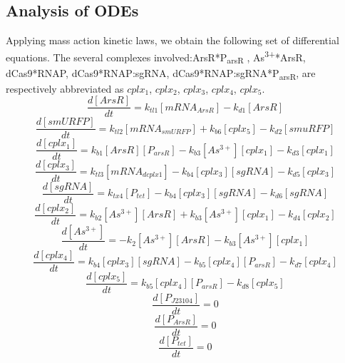 \subsection{Analysis of ODEs}
Applying mass action kinetic laws, we obtain the following set of differential equations. The several complexes involved:ArsR*P\textsubscript{arsR} , As\textsuperscript{3+}*ArsR, dCas9*RNAP, dCas9*RNAP:sgRNA, dCas9*RNAP:sgRNA*P\textsubscript{arsR}, are respectively abbreviated as $cplx_1$, $cplx_2$, $cplx_3$, $cplx_4$, $cplx_5$.
\begin{equation}
	\frac{d[ArsR]}{dt}=k_{tl1}[mRNA_{ArsR}]-k_{d1}[ArsR]\tag{1}
\end{equation}
\begin{equation}
	\frac{d[smURFP]}{dt}=k_{tl2}[mRNA_{smURFP}]+k_{b6}[cplx_5]-k_{d2}[smuRFP]\tag{2}
\end{equation}
\begin{equation}
	\frac{d[cplx_1]}{dt}=k_{b1}[ArsR][P_{arsR}]-k_{b3}[As^{3+}][cplx_1]-k_{d3}[cplx_1] \tag{3}
\end{equation}
\begin{equation}
	\frac{d[cplx_3]}{dt}=k_{tl3}[mRNA_{dcplx1}]-k_{b4}[cplx_3][sgRNA]-k_{d5}[cplx_3] \tag{4}
\end{equation}
\begin{equation}
	\frac{d[sgRNA]}{dt}=k_{tx4}[P_{tet}]-k_{b4}[cplx_3][sgRNA]-k_{d6}[sgRNA] \tag{5}
\end{equation}
\begin{equation}
	\frac{d[cplx_2]}{dt}=k_{b2}[As^{3+}][ArsR]+k_{b3}[As^{3+}][cplx_1]-k_{d4}[cplx_2] \tag{6}
\end{equation}
\begin{equation}
	\frac{d[As^{3+}]}{dt}=-k_{2}[As^{3+}][ArsR]-k_{b3}[As^{3+}][cplx_1] \tag{7}
\end{equation}
\begin{equation}
	\frac{d[cplx_4]}{dt}=k_{b4}[cplx_3][sgRNA]-k_{b5}[cplx_4][P_{arsR}]-k_{d7}[cplx_4]\tag{8}
\end{equation}
\begin{equation}
	\frac{d[cplx_5]}{dt}=k_{b5}[cplx_4][P_{arsR}]-k_{d8}[cplx_5]\tag{9}
\end{equation} 
\begin{equation}
	\frac{d[P_{J23104}]}{dt}=0\tag{10}
\end{equation} 
\begin{equation}
	\frac{d[P_{ArsR}]}{dt}=0\tag{11}
\end{equation} 
\begin{equation}
	\frac{d[P_{tet}]}{dt}=0\tag{12}
\end{equation} 
